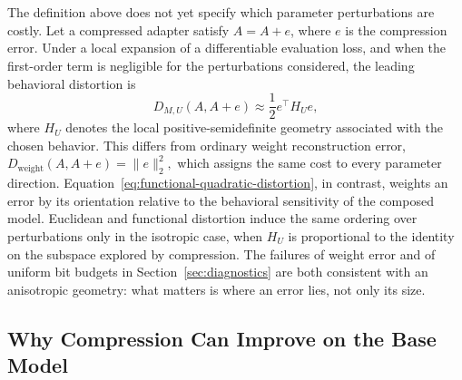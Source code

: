 The definition above does not yet specify which parameter perturbations are costly.
Let a compressed adapter satisfy $\hat A=A+e$, where $e$ is the compression error.
Under a local expansion of a differentiable evaluation loss, and when the first-order term is negligible for the perturbations considered, the leading behavioral distortion is
\begin{equation}
    D_{M,U}(A,A+e)
    \approx
    \frac{1}{2}e^\top H_U e ,
    \label{eq:functional-quadratic-distortion}
\end{equation}
where $H_U$ denotes the local positive-semidefinite geometry associated with the chosen behavior.
\newline
This differs from ordinary weight reconstruction error,
$
    D_{\mathrm{weight}}(A,A+e)=\|e\|_2^2,
$
which assigns the same cost to every parameter direction.
Equation~\ref{eq:functional-quadratic-distortion}, in contrast, weights an error by its orientation relative to the behavioral sensitivity of the composed model.
Euclidean and functional distortion induce the same ordering over perturbations only in the isotropic case, when $H_U$ is proportional to the identity on the subspace explored by compression.
\newline
The failures of weight error and of uniform bit budgets in Section~\ref{sec:diagnostics} are both consistent with an anisotropic geometry: what matters is where an error lies, not only its size.

\subsection{Why Compression Can Improve on the Base Model}
\label{sec:why-compression-helps}

